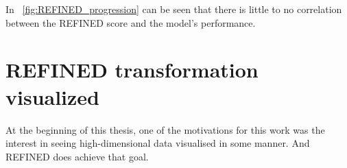 In ~\ref{fig:REFINED_progression} can be seen that there is little to no correlation between the REFINED score and the model's performance.

\section{REFINED transformation visualized}
At the beginning of this thesis, one of the motivations for this work was the interest in seeing high-dimensional data visualised in some manner. And REFINED does achieve that goal. 